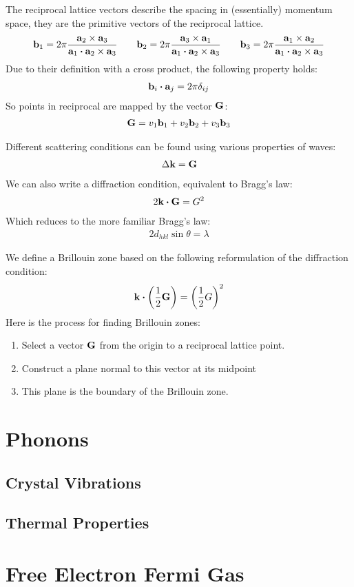 \documentclass[12pt]{article}
\begin{document}
The reciprocal lattice vectors describe the spacing in (essentially) momentum space, they are the primitive vectors of the reciprocal lattice. 
\begin{align*}
  \vb{b}_1=2\pi\frac{\vb{a}_2\times\vb{a}_3}
  {\vb{a}_1\vdot\vb{a}_2\times\vb{a}_3}\qquad
  \vb{b}_2=2\pi\frac{\vb{a}_3\times\vb{a}_1}
  {\vb{a}_1\vdot\vb{a}_2\times\vb{a}_3}\qquad
  \vb{b}_3=2\pi\frac{\vb{a}_1\times\vb{a}_2}
  {\vb{a}_1\vdot\vb{a}_2\times\vb{a}_3}
\end{align*}
Due to their definition with a cross product, the following property holds:
\begin{align*}
  \vb{b}_i\vdot\vb{a}_j=2\pi\delta_{ij}
\end{align*}
So points in reciprocal are mapped by the vector $\vb{G}$:
\begin{align*}
  \vb{G}=v_1\vb{b}_1+v_2\vb{b}_2+v_3\vb{b}_3
\end{align*}

Different scattering conditions can be found using various properties of waves:
\begin{align*}
  \Delta{\vb{k}}=\vb{G}
\end{align*}
We can also write a diffraction condition, equivalent to Bragg's law:
\begin{align*}
  2\vb{k}\vdot\vb{G}=G^2
\end{align*}
Which reduces to the more familiar Bragg's law:
\begin{align*}
  2d_{hkl}\sin\theta=\lambda
\end{align*}

We define a Brillouin zone based on the following reformulation of the diffraction condition:
\begin{align*}
  \vb{k}\vdot\qty(\frac{1}{2}\vb{G})=\qty(\frac{1}{2}G)^2
\end{align*}
Here is the process for finding Brillouin zones:
\begin{enumerate}
\item Select a vector $\vb{G}$ from the origin to a reciprocal lattice point.
\item Construct a plane normal to this vector at its midpoint
\item This plane is the boundary of the Brillouin zone.
\end{enumerate}
\section{Phonons}

\subsection{Crystal Vibrations}

\subsection{Thermal Properties}

\section{Free Electron Fermi Gas}
\end{document}
